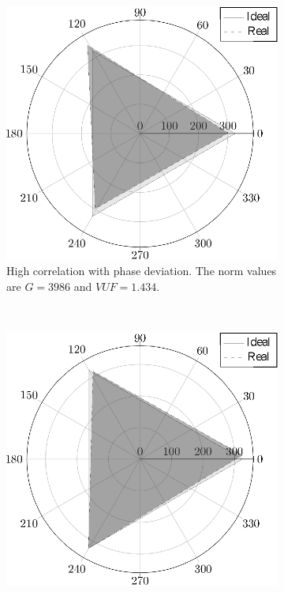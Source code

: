             \begin{figure}
                \centering
                \begin{subfigure}[b]{0.48\textwidth}
                    \includegraphics[width=\textwidth]{Unblance_EPS_Pics/EPS_images/rombus.eps}
                    \caption{\centering High correlation with phase deviation. The norm values are $G=3986$ and $VUF=1.434$.}
                    \label{fig:cases_A}
                \end{subfigure}
                ~ %
                \begin{subfigure}[b]{0.48\textwidth}
                    \includegraphics[width=\textwidth]{Unblance_EPS_Pics/EPS_images/triangle.eps}

\end{subfigure}
\end{figure}
